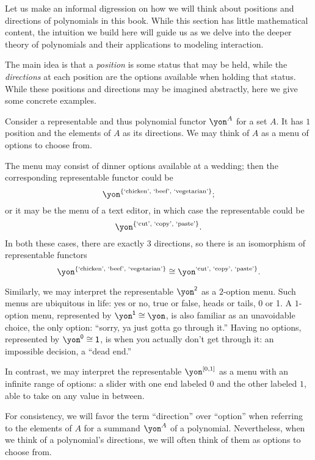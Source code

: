 \documentclass[Book-Poly]{subfiles}
\begin{document}
Let us make an informal digression on how we will think about positions and directions of polynomials in this book.
While this section has little mathematical content, the intuition we build here will guide us as we delve into the deeper theory of polynomials and their applications to modeling interaction.

The main idea is that a \emph{position} is some status that may be held, while the \emph{directions} at each position are the options available when holding that status.
While these positions and directions may be imagined abstractly, here we give some concrete examples.

\begin{example} \label{ex.reps-as-menus}
    Consider a representable and thus polynomial functor $\yon^A$ for a set $A$.
    It has $1$ position and the elements of $A$ as its directions.
    We may think of $A$ as a menu of options to choose from.

    The menu may consist of dinner options available at a wedding; then the corresponding representable functor could be
    \[
        \yon^{\{\text{`chicken', `beef', `vegetarian'}\}};
    \]
    or it may be the menu of a text editor, in which case the representable could be
    \[
        \yon^{\{\text{`cut', `copy', `paste'}\}}.
    \]
    In both these cases, there are exactly $3$ directions, so there is an isomorphism of representable functors
    \[
        \yon^{\{\text{`chicken', `beef', `vegetarian'}\}} \iso \yon^{\text{`cut', `copy', `paste'}\}}.
    \]

    Similarly, we may interpret the representable $\yon^\2$ as a $2$-option menu.
    Such menus are ubiquitous in life: yes or no, true or false, heads or tails, 0 or 1.
    A $1$-option menu, represented by $\yon^\1\iso\yon$, is also familiar as an unavoidable choice, the only option: ``sorry, ya just gotta go through it.''
    Having no options, represented by $\yon^\0\iso\1$, is when you actually don't get through it: an impossible decision, a ``dead end.''

    In contrast, we may interpret the representable $\yon^{[0,1]}$ as a menu with an infinite range of options: a slider with one end labeled $0$ and the other labeled $1$, able to take on any value in between.
\end{example}

For consistency, we will favor the term ``direction'' over ``option'' when referring to the elements of $A$ for a summand $\yon^A$ of a polynomial.
Nevertheless, when we think of a polynomial's directions, we will often think of them as options to choose from.
\end{document}
